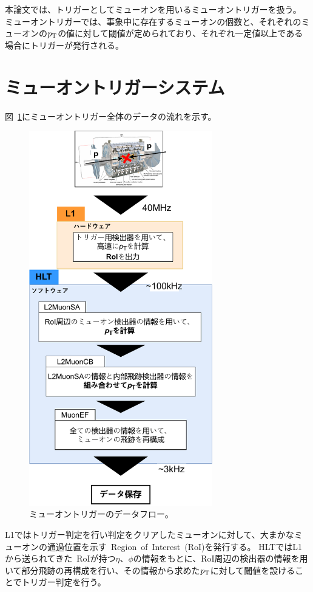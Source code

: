 本論文では、トリガーとしてミューオンを用いるミューオントリガーを扱う。
ミューオントリガーでは、事象中に存在するミューオンの個数と、それぞれのミューオンの$p_\mathrm{T}$の値に対して閾値が定められており、それぞれ一定値以上である場合にトリガーが発行される。


\section{ミューオントリガーシステム}\label{chapter3-2}
図~\ref{fig:muonTrigger}にミューオントリガー全体のデータの流れを示す。

\begin{figure}[H]
  \centering
  \includegraphics[clip, width=8cm]{fig/3/muonTrigger.pdf}
  \caption{ミューオントリガーのデータフロー。}
  \label{fig:muonTrigger}
\end{figure}

L1ではトリガー判定を行い判定をクリアしたミューオンに対して、大まかなミューオンの通過位置を示す~Region~of~Interest~(RoI)を発行する。
HLTではL1から送られてきた~RoIが持つ$\eta$、$\phi$の情報をもとに、RoI周辺の検出器の情報を用いて部分飛跡の再構成を行い、その情報から求めた$p_\mathrm{T}$に対して閾値を設けることでトリガー判定を行う。

